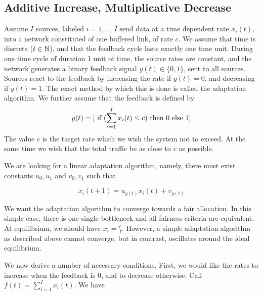 \subsection{Additive Increase, Multiplicative Decrease}
Assume $I$ sources, labeled $i=1,\ldots, I$ send data at
a time dependent rate $x_{i}(t)$, into a network constituted of one
buffered link, of rate $c$.  We assume that time is discrete ($t \in
\Bbb{N}$), and that the feedback cycle lasts exactly one time unit.
During one time cycle of duration 1 unit of time, the source rates
are constant, and the network generates a binary feedback signal
$y(t) \in \{0, 1 \}$, sent to all sources. Sources react to the
feedback by increasing the rate if $y(t)=0$, and decreasing if
$y(t)=1$. The exact method by which this is done is called the
adaptation algorithm. We further assume that the feedback is defined
by
$$
y(t) = [ \textrm{ if } (\sum_{i=1}^I x_{i}(t) \leq c ) \textrm{ then }  0 \textrm{ else } 1 ]
$$
The value $c$ is the target rate which we wish the system not to
exceed. At the same time we wish that the total traffic be as
close to $c$ as possible.

We are looking for a linear adaptation algorithm, namely, there
must exist constants $u_{0}, u_{1}$ and $v_{0}, v_{1}$ such that

\begin{equation}
        x_{i}(t+1) = u_{y(t)} x_{i}(t) + v_{y(t)}
        \label{eq-theo-addmul1}
\end{equation}

We want the adaptation algorithm to converge towards a fair
allocation. In this simple case, there is one single bottleneck
and all fairness criteria are equivalent. At equilibrium, we
should have $x_{i}= \frac{c}{I}$. However, a simple adaptation
algorithm as described above cannot converge, but in contrast,
oscillates around the ideal equilibrium.

We now derive a number of necessary conditions. First, we would
like the rates to increase when the feedback is $0$, and to
decrease otherwise. Call $f(t)=\sum_{i=1}^I x_{i}(t)$. We have

